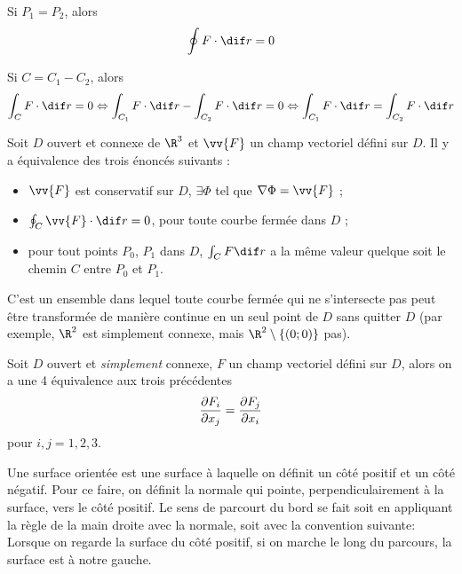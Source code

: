 \begin{myprop}
	Si $P_1 = P_2$, alors
	\[ \oint F \cdot \dif r = 0 \]

	Si $C = C_1 - C_2$, alors
	\[ \int_C F \cdot \dif r = 0 \Leftrightarrow \int_{C_1} F \cdot \dif r - \int_{C_2} F \cdot \dif r = 0
	\Leftrightarrow \int_{C_1} F \cdot \dif r = \int_{C_2} F \cdot \dif r \]
\end{myprop}

\begin{mytheo} Soit $D$ ouvert et connexe de $\R^3$ et $\vv{F}$ un champ vectoriel défini sur $D$. Il y a équivalence des trois énoncés suivants :
	\begin{itemize}
		\item $\vv{F}$ est conservatif sur $D$, $\exists \Phi$ tel que $\nabla \Phi = \vv{F}$ ;
		\item $\oint_C \vv{F} \cdot \dif r = 0$, pour toute courbe fermée dans $D$ ;
		\item pour tout points $P_0$, $P_1$ dans $D$, $\int_C F \dif r$ a la même valeur quelque soit le chemin $C$ entre $P_0$ et $P_1$.
	\end{itemize}
\end{mytheo}

\begin{mydef} C'est un ensemble dans lequel toute courbe fermée qui ne s'intersecte pas peut être transformée de manière continue en un seul point de $D$ sans quitter $D$ (par exemple, $\R^2$ est simplement connexe, mais $\R^2 \setminus \{(0;0)\}$ pas).
\end{mydef}

\begin{mytheo} Soit $D$ ouvert et \emph{simplement} connexe, $F$ un champ vectoriel défini sur $D$, alors on a une 4\ieme{} équivalence aux trois précédentes
	\[ \frac{\partial F_i}{\partial x_j} = \frac{\partial F_j}{\partial x_i} \]
	pour $i,j = 1,2,3$.
\end{mytheo}

\begin{mydef}
	Une surface orientée est une surface à laquelle on définit un côté positif et un côté négatif.
	Pour ce faire, on définit la normale qui pointe, perpendiculairement à la surface, vers le côté positif.
	Le sens de parcourt du bord se fait soit en appliquant la règle de la main droite avec la normale,
	soit avec la convention suivante:
	Lorsque on regarde la surface du côté positif, si on marche le long du parcours, la surface est à notre gauche.
\end{mydef}


